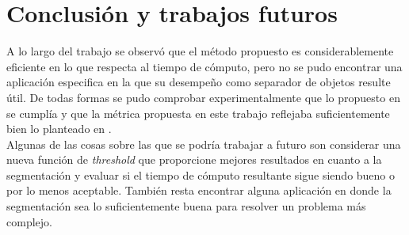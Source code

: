 \section{Conclusión y trabajos futuros}

A lo largo del trabajo se observ\'o que el m\'etodo propuesto es considerablemente eficiente en lo que respecta al tiempo de c\'omputo, pero no se pudo encontrar una aplicaci\'on especifica en la que su desempe\~no como separador de objetos resulte útil. De todas formas se pudo comprobar experimentalmente que lo propuesto en \cite{Felzenszwalb2004} se cumpl\'ia y que la m\'etrica propuesta en este trabajo reflejaba suficientemente bien lo planteado en \cite{li2013benchmark}. \\
\indent Algunas de las cosas sobre las que se podr\'ia trabajar a futuro son considerar una nueva funci\'on de \textit{threshold} que proporcione mejores resultados en cuanto a la segmentaci\'on y evaluar si el tiempo de c\'omputo resultante sigue siendo bueno o por lo menos aceptable. También resta encontrar alguna aplicaci\'on en donde la segmentaci\'on sea lo suficientemente buena para resolver un problema m\'as complejo. 